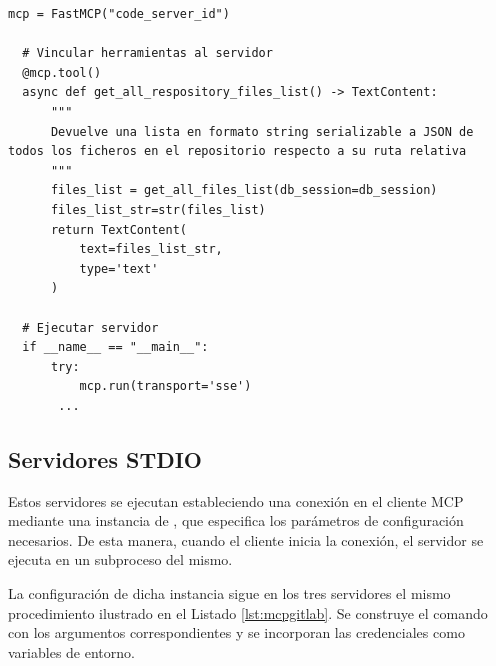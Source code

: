 \begin{itemize}
\begin{lstlisting}[caption={\protect\opus{mcp_code_server.py:} ejecución del servidor MCP con acceso al código fuente},label={lst:mcpcod}]
  mcp = FastMCP("code_server_id")

  # Vincular herramientas al servidor
  @mcp.tool()
  async def get_all_respository_files_list() -> TextContent:
      """
      Devuelve una lista en formato string serializable a JSON de todos los ficheros en el repositorio respecto a su ruta relativa
      """
      files_list = get_all_files_list(db_session=db_session)
      files_list_str=str(files_list)
      return TextContent(
          text=files_list_str,
          type='text'
      )

  # Ejecutar servidor
  if __name__ == "__main__":
      try:
          mcp.run(transport='sse')
       ...

\end{lstlisting}


\end{itemize}

\subsection{Servidores STDIO}
\label{sec:stdio}
Estos servidores se ejecutan estableciendo una conexión en el cliente MCP mediante una instancia de , que especifica los parámetros de configuración necesarios. De esta manera, cuando el cliente inicia la conexión, el servidor se ejecuta en un subproceso del mismo.

La configuración de dicha instancia sigue en los tres servidores el mismo procedimiento ilustrado en el Listado \ref{lst:mcpgitlab}. Se construye el comando con los argumentos correspondientes y se incorporan las credenciales como variables de entorno.

